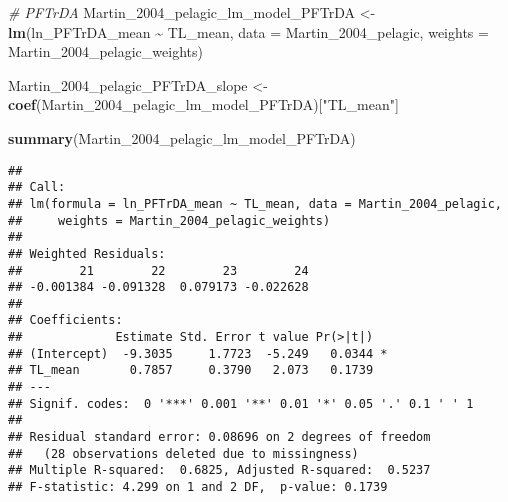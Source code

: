 \documentclass[
]{article}
\newenvironment{Shaded}{\begin{snugshade}}{\end{snugshade}}
\newcommand{\AttributeTok}[1]{\textcolor[rgb]{0.13,0.29,0.53}{#1}}
\newcommand{\CommentTok}[1]{\textcolor[rgb]{0.56,0.35,0.01}{\textit{#1}}}
\newcommand{\FunctionTok}[1]{\textcolor[rgb]{0.13,0.29,0.53}{\textbf{#1}}}
\newcommand{\NormalTok}[1]{#1}
\newcommand{\OtherTok}[1]{\textcolor[rgb]{0.56,0.35,0.01}{#1}}
\newcommand{\SpecialCharTok}[1]{\textcolor[rgb]{0.81,0.36,0.00}{\textbf{#1}}}
\newcommand{\StringTok}[1]{\textcolor[rgb]{0.31,0.60,0.02}{#1}}
\begin{document}
\begin{Shaded}
\begin{Highlighting}[]
\CommentTok{\# PFTrDA}
\NormalTok{Martin\_2004\_pelagic\_lm\_model\_PFTrDA }\OtherTok{\textless{}{-}} \FunctionTok{lm}\NormalTok{(ln\_PFTrDA\_mean }\SpecialCharTok{\textasciitilde{}}\NormalTok{ TL\_mean, }
                                        \AttributeTok{data =}\NormalTok{ Martin\_2004\_pelagic,}
                                        \AttributeTok{weights =}\NormalTok{ Martin\_2004\_pelagic\_weights)}

\NormalTok{Martin\_2004\_pelagic\_PFTrDA\_slope }\OtherTok{\textless{}{-}} \FunctionTok{coef}\NormalTok{(Martin\_2004\_pelagic\_lm\_model\_PFTrDA)[}\StringTok{"TL\_mean"}\NormalTok{]}

\FunctionTok{summary}\NormalTok{(Martin\_2004\_pelagic\_lm\_model\_PFTrDA)}
\end{Highlighting}
\end{Shaded}

\begin{verbatim}
## 
## Call:
## lm(formula = ln_PFTrDA_mean ~ TL_mean, data = Martin_2004_pelagic, 
##     weights = Martin_2004_pelagic_weights)
## 
## Weighted Residuals:
##        21        22        23        24 
## -0.001384 -0.091328  0.079173 -0.022628 
## 
## Coefficients:
##             Estimate Std. Error t value Pr(>|t|)  
## (Intercept)  -9.3035     1.7723  -5.249   0.0344 *
## TL_mean       0.7857     0.3790   2.073   0.1739  
## ---
## Signif. codes:  0 '***' 0.001 '**' 0.01 '*' 0.05 '.' 0.1 ' ' 1
## 
## Residual standard error: 0.08696 on 2 degrees of freedom
##   (28 observations deleted due to missingness)
## Multiple R-squared:  0.6825, Adjusted R-squared:  0.5237 
## F-statistic: 4.299 on 1 and 2 DF,  p-value: 0.1739
\end{verbatim}
\end{document}
